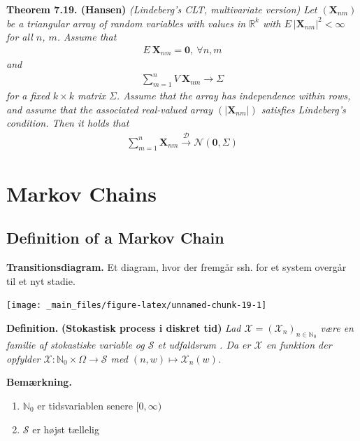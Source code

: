 \documentclass[
]{book}
\providecommand{\tightlist}{%
  \setlength{\itemsep}{0pt}\setlength{\parskip}{0pt}}
\begin{document}
\textbf{Theorem 7.19. (Hansen)} \emph{(Lindeberg's CLT, multivariate version) Let \((\mathbf{X}_{nm})\) be a triangular array of random variables with values in \(\mathbb{R}^k\) with \(E\ \vert \mathbf{X}_{nm}\vert^2<\infty\) for all \(n\), \(m\). Assume that}
\begin{align*}
    E\ \mathbf{X}_{nm}=\mathbf{0},\ \forall n,m
\end{align*}
\emph{and}
\begin{align*}
    \sum_{m=1}^n V\ \mathbf{X}_{nm}\to \Sigma
\end{align*}
\emph{for a fixed \(k\times k\) matrix \(\Sigma\). Assume that the array has independence within rows, and assume that the associated real-valued array \((\vert\mathbf{X}_{nm}\vert )\) satisfies Lindeberg's condition. Then it holds that}
\begin{align*}
    \sum_{m=1}^n\mathbf{X}_{nm}\stackrel{\mathcal{D}}{\to} \mathcal{N}(\mathbf{0},\Sigma)
\end{align*}

\hypertarget{markov-chains}{%
\chapter{Markov Chains}\label{markov-chains}}

\hypertarget{definition-of-a-markov-chain}{%
\section{Definition of a Markov Chain}\label{definition-of-a-markov-chain}}

\textbf{Transitionsdiagram.} Et diagram, hvor der fremgår ssh. for et system overgår til et nyt stadie.

\begin{center}\texttt{[image: \_main\_files/figure-latex/unnamed-chunk-19-1]} \end{center}

\textbf{Definition.} \textbf{(Stokastisk process i diskret tid)} \emph{Lad \(\mathcal{X}=(\mathcal{X}_n)_{n\in\mathbb{N}_0}\) være en familie af stokastiske variable og \(\mathcal{S}\) et udfaldsrum . Da er \(\mathcal{X}\) en funktion der opfylder \(\mathcal{X} : \mathbb{N}_0\times \Omega \to \mathcal{S}\) med \((n,w) \mapsto \mathcal{X}_n(w)\).}

\textbf{Bemærkning.}

\begin{enumerate}
\def\labelenumi{\roman{enumi}.}
\tightlist
\item
  \(\mathbb{N}_0\) er tidsvariablen senere \([0,\infty)\)
\item
  \(\mathcal{S}\) er højst tællelig
\end{enumerate}
\end{document}
